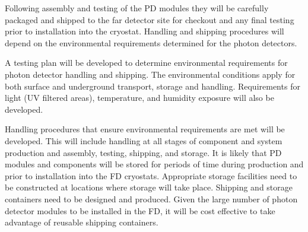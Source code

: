 






Following assembly and testing of the PD modules they will be carefully packaged and shipped to the far detector site for checkout and any final testing prior to installation into the cryostat. Handling and shipping procedures will depend on the environmental requirements determined for the photon detectors. 

A testing plan will be developed to determine environmental requirements for photon detector handling and shipping. The environmental conditions apply for both surface and underground transport, storage and handling. Requirements for light (UV filtered areas), temperature, and humidity exposure will also be developed.

Handling procedures that ensure environmental requirements are met will be developed. This will include handling at all stages of component and system production and assembly, testing, shipping, and storage. It is likely that PD modules and components will be stored for periods of time during production and prior to installation into the FD cryostats. Appropriate storage facilities need to be constructed at locations where storage will take place. Shipping and storage containers need to be designed and produced. Given the large number of photon detector modules to be installed in the FD, it will be cost effective to take advantage of reusable shipping containers.

